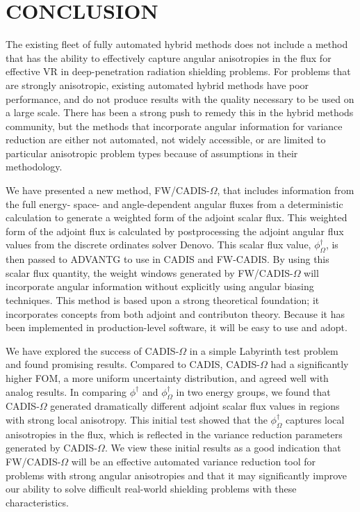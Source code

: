 \documentclass[12pt]{article}
\begin{document}
%
\section{CONCLUSION} 
\label{sect::conclusion}

The existing fleet of fully automated hybrid methods does not include a method that has the ability to effectively capture angular anisotropies in the flux for effective VR in deep-penetration radiation shielding problems. For problems that are strongly anisotropic, existing automated hybrid methods have poor performance, and do not produce results with the quality necessary to be used on a large scale. There has been a strong push to remedy this in the hybrid methods community, but the methods that incorporate angular information for variance reduction are either not automated, not widely accessible, or are limited to particular anisotropic problem types because of assumptions in their methodology. 

We have presented a new method, FW/CADIS-$\Omega$, that includes information from the full energy- space- and angle-dependent angular fluxes from a deterministic calculation to generate a weighted form of the adjoint scalar flux. This weighted form of the adjoint flux is calculated by postprocessing the adjoint angular flux values from the discrete ordinates solver Denovo. This scalar flux value, $\phi^{\dagger}_{\Omega}$, is then passed to ADVANTG to use in CADIS and FW-CADIS. By using this scalar flux quantity, the weight windows generated by FW/CADIS-$\Omega$ will incorporate angular information without explicitly using angular biasing techniques. This method is based upon a strong theoretical foundation; it incorporates concepts from both adjoint and contributon theory. Because it has been implemented in production-level software, it will be easy to use and adopt. 

We have explored the success of CADIS-$\Omega$ in a simple Labyrinth test problem and found promising results. 
Compared to CADIS, CADIS-$\Omega$ had a significantly higher FOM, a more uniform uncertainty distribution, and agreed well with analog results. 
In comparing $\phi^{\dagger}$ and $\phi^{\dagger}_{\Omega}$ in two energy groups, we found that CADIS-$\Omega$ generated dramatically different adjoint scalar flux values in regions with strong local anisotropy. 
This initial test showed that the $\phi^{\dagger}_{\Omega}$ captures local anisotropies in the flux, which is reflected in the variance reduction parameters generated by CADIS-$\Omega$.
We view these initial results as a good indication that FW/CADIS-$\Omega$ will be an effective automated variance reduction tool for problems with strong angular anisotropies and that it may significantly improve our ability to solve difficult real-world shielding problems with these characteristics. 
\end{document}
